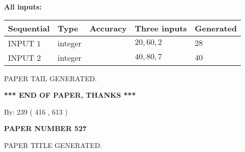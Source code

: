 \documentclass[12pt]{article}
\begin{document}
   
   
   
\noindent\vspace{0.1in}\hspace{-0.08in} {\textbf{\Large{All inputs: }}}
   
   
  
  
\noindent\begin{tabular}{|l|l|l|l|l|}
\hline
 Sequential & Type & Accuracy & Three inputs & Generated \\ 
\hline
 
 
  INPUT $  1 $ & integer &  & $
 20
 , 
 60
 , 
 2
 $ & $ 28 $ 
 \\  \hline  
 
 
  INPUT $  2 $ & integer &  & $
 40
 , 
 80
 , 
 7
 $ & $ 40 $ 
 \\  \hline  
 \end{tabular}
   
   
   
   
   
   
 \vspace{0.2in}
 
   
   
\vspace{2.0in} PAPER TAIL GENERATED.
   
   
   
   
\vspace{1.0in} 
{\textbf{\large{ *** END OF PAPER, THANKS *** }}} 
   
   
\hspace{1.0in} By: 
 239 ( 416 ,  613 )
   
   
   
   
\newpage 
\setcounter{page}{ 
   527001 } 
   
   
   
   
 {\textbf{ \Large{ PAPER NUMBER  527  }}}
   
   
\vspace{0.2in}
   
   
   
   
   
   
   
   
 \vspace{0.2in}
 
 
 
 
   
   
 PAPER TITLE GENERATED.
   
   
   
\vspace{0.2in}
   
\end{document}

